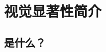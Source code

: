 \documentclass[notheorems,mathserif,table,compress]{beamer}  %
\begin{document}
 
\section{视觉显著性简介}

\subsection{是什么？}
\end{document}
